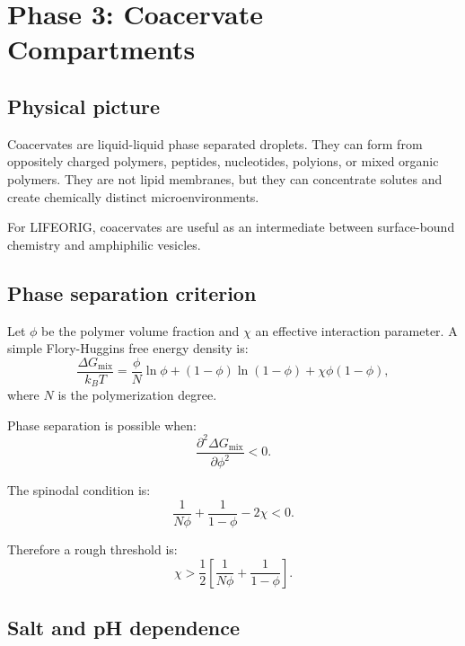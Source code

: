 \documentclass[11pt]{article}
\begin{document}
\section{Phase 3: Coacervate Compartments}

\subsection{Physical picture}

Coacervates are liquid-liquid phase separated droplets. They can form from
oppositely charged polymers, peptides, nucleotides, polyions, or mixed organic
polymers. They are not lipid membranes, but they can concentrate solutes and
create chemically distinct microenvironments.

For LIFEORIG, coacervates are useful as an intermediate between surface-bound
chemistry and amphiphilic vesicles.

\subsection{Phase separation criterion}

Let $\phi$ be the polymer volume fraction and $\chi$ an effective interaction
parameter. A simple Flory-Huggins free energy density is:
\begin{equation}
    \frac{\Delta G_{\mathrm{mix}}}{k_BT}
    =
    \frac{\phi}{N}\ln\phi
    +
    (1-\phi)\ln(1-\phi)
    +
    \chi \phi(1-\phi),
\end{equation}
where $N$ is the polymerization degree.

Phase separation is possible when:
\begin{equation}
    \frac{\partial^2 \Delta G_{\mathrm{mix}}}{\partial \phi^2} < 0.
\end{equation}

The spinodal condition is:
\begin{equation}
    \frac{1}{N\phi} + \frac{1}{1-\phi} - 2\chi < 0.
\end{equation}

Therefore a rough threshold is:
\begin{equation}
    \chi >
    \frac{1}{2}
    \left[
    \frac{1}{N\phi} + \frac{1}{1-\phi}
    \right].
\end{equation}

\subsection{Salt and pH dependence}
\end{document}
